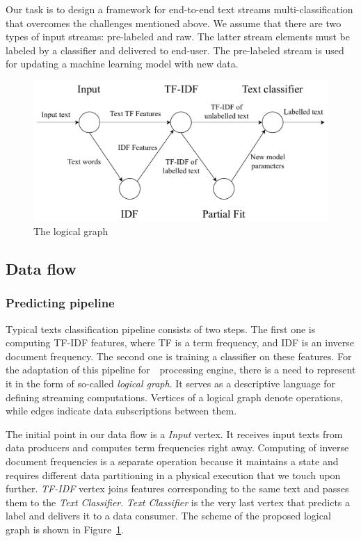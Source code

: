 \label{fs-framework}

Our task is to design a framework for end-to-end text streams multi-classification that overcomes the challenges mentioned above. We assume that there are two types of input streams: pre-labeled and raw. The latter stream elements must be labeled by a classifier and delivered to end-user. The pre-labeled stream is used for updating a machine learning model with new data.

\begin{figure}[htbp]
  \centering
  \includegraphics[scale=0.48]{pics/logical-graph}
  \caption{The logical graph}
  \label {logical_graph}
\end{figure}

\subsection{Data flow \label{DF}}

\subsubsection{Predicting pipeline}

Typical texts classification pipeline consists of two steps. The first one is computing TF-IDF features, where TF is a term frequency, and IDF is an inverse document frequency. The second one is training a classifier on these features. For the adaptation of this pipeline for~\FlameStream\ processing engine, there is a need to represent it in the form of so-called {\em logical graph}. It serves as a descriptive language for defining streaming computations. Vertices of a logical graph denote operations, while edges indicate data subscriptions between them. 

The initial point in our data flow is a {\em Input} vertex. It receives input texts from data producers and computes term frequencies right away. Computing of inverse document frequencies is a separate operation because it maintains a state and requires different data partitioning in a physical execution that we touch upon further. {\em TF-IDF} vertex joins features corresponding to the same text and passes them to the {\em Text Classifier}. {\em Text Classifier} is the very last vertex that predicts a label and delivers it to a data consumer. The scheme of the proposed logical graph is shown in Figure~\ref{logical_graph}.

